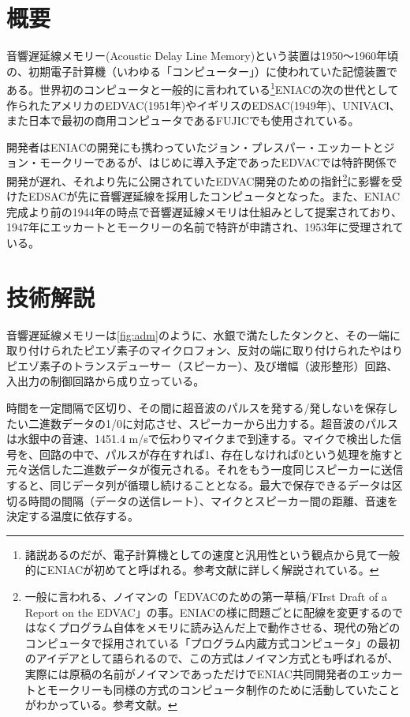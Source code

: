 \documentclass[a4paper,report]{jsbook}
\begin{document}
\section{概要}\label{ux6982ux8981}

音響遅延線メモリー(Acoustic Delay Line
Memory)という装置は1950〜1960年頃の、初期電子計算機（いわゆる「コンピューター」）に使われていた記憶装置である。世界初のコンピュータと一般的に言われている\footnote{諸説あるのだが、電子計算機としての速度と汎用性という観点から見て一般的にENIACが初めてと呼ばれる。参考文献\autocite{invent_computer}に詳しく解説されている。}ENIACの次の世代として作られたアメリカのEDVAC(1951年)やイギリスのEDSAC(1949年)、UNIVACⅠ、また日本で最初の商用コンピュータであるFUJICでも使用されている\autocite{ipsjmusium}。

開発者はENIACの開発にも携わっていたジョン・プレスパー・エッカートとジョン・モークリーであるが、はじめに導入予定であったEDVACでは特許関係で開発が遅れ、それより先に公開されていたEDVAC開発のための指針\footnote{一般に言われる、ノイマンの「EDVACのための第一草稿/FIrst
  Draft of a Report on the
  EDVAC」の事。ENIACの様に問題ごとに配線を変更するのではなくプログラム自体をメモリに読み込んだ上で動作させる、現代の殆どのコンピュータで採用されている「プログラム内蔵方式コンピュータ」の最初のアイデアとして語られるので、この方式はノイマン方式とも呼ばれるが、実際には原稿の名前がノイマンであっただけでENIAC共同開発者のエッカートとモークリーも同様の方式のコンピュータ制作のために活動していたことがわかっている。参考文献\autocite{von1993first}。}に影響を受けたEDSACが先に音響遅延線を採用したコンピュータとなった。また、ENIAC完成より前の1944年の時点で音響遅延線メモリは仕組みとして提案されており、1947年にエッカートとモークリーの名前で特許が申請され、1953年に受理されている\autocite{eckert1953memory}。

\section{技術解説}\label{ux6280ux8853ux89e3ux8aac}

音響遅延線メモリーは\cref{fig:adm}のように、水銀で満たしたタンクと、その一端に取り付けられたピエゾ素子のマイクロフォン、反対の端に取り付けられたやはりピエゾ素子のトランスデューサー（スピーカー）、及び増幅（波形整形）回路、入出力の制御回路から成り立っている。

時間を一定間隔で区切り、その間に超音波のパルスを発する/発しないを保存したい二進数データの1/0に対応させ、スピーカーから出力する。超音波のパルスは水銀中の音速、1451.4
m/sで伝わりマイクまで到達する。マイクで検出した信号を、回路の中で、パルスが存在すれば1、存在しなければ0という処理を施すと元々送信した二進数データが復元される。それをもう一度同じスピーカーに送信すると、同じデータ列が循環し続けることとなる。最大で保存できるデータは区切る時間の間隔（データの送信レート）、マイクとスピーカー間の距離、音速を決定する温度に依存する。
\end{document}
